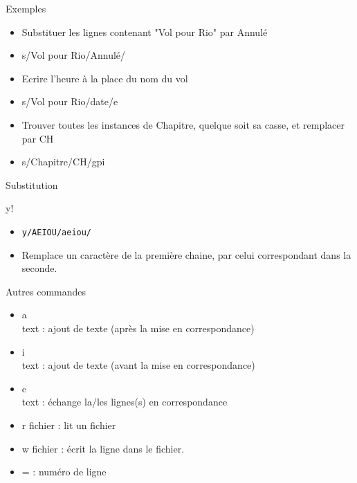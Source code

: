 \begin{frame}[containsverbatim]{\ftitle}
\def\blocktitle{Exemples}
\begin{block}{\blocktitle}
\begin{itemize}
\item Substituer les lignes contenant "Vol pour Rio" par Annulé
\item s/Vol pour Rio/Annulé/
\item Ecrire l'heure à la place du nom du vol
\item s/Vol pour Rio/date/e
\item Trouver toutes les instances de Chapitre, quelque soit sa casse, et remplacer par CH
\item s/Chapitre/CH/gpi
\end{itemize}
\end{block}
\end{frame}

\def\ftitle{Substitution}
\begin{frame}[containsverbatim]{\ftitle}
\def\blocktitle{y!}
\begin{block}{\blocktitle}
\begin{itemize}
\item \verb!y/AEIOU/aeiou/!
\item Remplace un caractère de la première chaine, par celui correspondant dans la seconde.
\end{itemize}
\end{block}
\def\blocktitle{Autres commandes}
\begin{block}{\blocktitle}
\begin{itemize}
\item a\\text : ajout de texte (après la mise en correspondance)
\item i\\text : ajout de texte (avant la mise en correspondance)
\item c\\text : échange la/les lignes(s) en correspondance
\item r fichier : lit un fichier
\item w fichier : écrit la ligne dans le fichier.
\item = : numéro de ligne
\end{itemize}
\end{block}
\end{frame}



